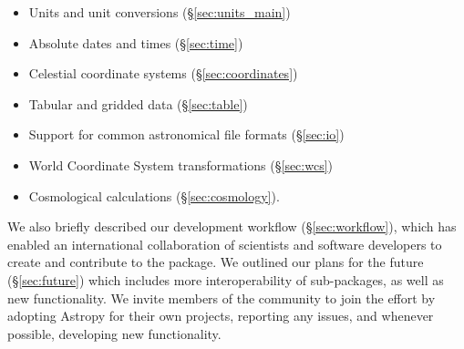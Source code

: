 \documentclass[traditabstract]{aa}
\begin{document}
\begin{itemize}
\item Units and unit conversions (\S\ref{sec:units_main})
\item Absolute dates and times (\S\ref{sec:time})
\item Celestial coordinate systems (\S\ref{sec:coordinates})
\item Tabular and gridded data (\S\ref{sec:table})
\item Support for common astronomical file formats (\S\ref{sec:io})
\item World Coordinate System transformations (\S\ref{sec:wcs})
\item Cosmological calculations (\S\ref{sec:cosmology}).
\end{itemize}

We also briefly
described our development workflow (\S\ref{sec:workflow}), which has enabled an international collaboration of scientists and software developers to create and contribute to the package.
We outlined our plans for the future (\S\ref{sec:future}) which includes more interoperability of sub-packages, as well as new functionality. We invite
members of the community to join the effort by adopting Astropy for their own
projects, reporting any issues, and whenever possible, developing new
functionality.



\end{document}
